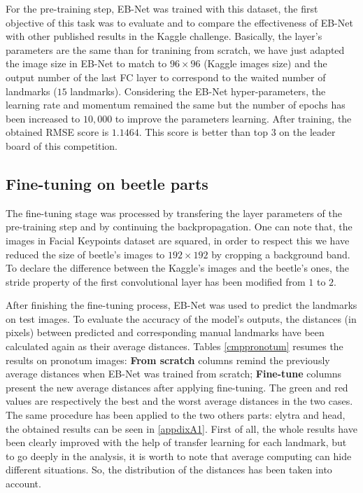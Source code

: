 \documentclass[review]{elsarticle}
\begin{document}
For the pre-training step, EB-Net was trained with this dataset,
the first objective of this task was to evaluate and to compare the
effectiveness of EB-Net with other published results in the
Kaggle challenge. Basically, the layer's parameters are the same than for
tranining from scratch, we have just adapted the image size in EB-Net
to match to $96 \times 96$ (Kaggle images size) and the output number of the last FC layer to
correspond to the waited number of landmarks ($15$
landmarks). Considering the EB-Net hyper-parameters, the learning rate and momentum remained the
same but the number of epochs has been increased to $10,000$ to improve the parameters learning. After training, the
obtained RMSE score is $1.1464$. This score is better than top $3$ on the leader board of this competition.

\subsection{Fine-tuning on beetle parts}
The fine-tuning stage was processed by transfering the layer parameters of
the pre-training step and by continuing the backpropagation. One can note that, the images in Facial Keypoints
dataset are squared, in order to respect this we have reduced the size
of beetle's images to $192 \times 192$ by cropping a background
band. To declare the difference between the Kaggle's images and the
beetle's ones, the stride property of the first convolutional
layer has been modified from $1$ to $2$.

After finishing the fine-tuning process, EB-Net was used to predict the
landmarks on test images. To evaluate the accuracy of the model's
outputs, the distances (in pixels) between predicted and corresponding
manual landmarks have been calculated again as their average
distances. Tables \ref{cmppronotum} resumes the results on pronotum
images: \textbf{From scratch} columns remind the previously average
distances when EB-Net was trained from scratch; \textbf{Fine-tune}
columns present the new average distances after applying
fine-tuning. The green and red values are respectively the best and
the worst average distances in the two cases. The same procedure has
been applied to the two others parts: elytra and head, the obtained results can be
seen in \ref{appdixA1}. First of all, the whole results have been clearly
improved with the help of transfer learning for each landmark, but to
go deeply in the analysis, it is worth to note that average computing can hide different situations. So, the distribution of the distances has been taken into
account. 
\end{document}
